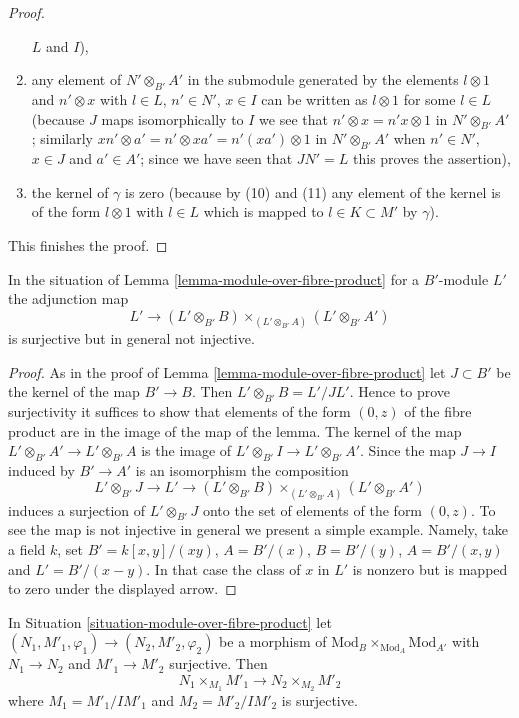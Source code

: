 \begin{proof}
\begin{enumerate}
$L$ and $I$),
\item any element of $N' \otimes_{B'} A'$ in the submodule generated
by the elements $l \otimes 1$ and $n' \otimes x$ with
$l \in L$, $n' \in N'$, $x \in I$ can be written as $l \otimes 1$
for some $l \in L$ (because $J$ maps isomorphically to $I$ we see
that $n' \otimes x = n'x \otimes 1$ in $N' \otimes_{B'} A'$;
similarly $x n' \otimes a' = n' \otimes xa' = n'(xa') \otimes 1$
in $N' \otimes_{B'} A'$ when $n' \in N'$, $x \in J$ and $a' \in A'$;
since we have seen that $JN' = L$ this proves the assertion),
\item the kernel of $\gamma$ is zero (because by (10) and (11) any element of
the kernel is of the form $l \otimes 1$ with $l \in L$ which
is mapped to $l \in K \subset M'$ by $\gamma$).
\end{enumerate}
This finishes the proof.
\end{proof}

\begin{lemma}
\label{lemma-module-over-fibre-product-bis}
In the situation of Lemma \ref{lemma-module-over-fibre-product}
for a $B'$-module $L'$ the adjunction map
$$
L' \longrightarrow 
(L' \otimes_{B'} B) \times_{(L' \otimes_{B'} A)} (L' \otimes_{B'} A')
$$
is surjective but in general not injective.
\end{lemma}

\begin{proof}
As in the proof of Lemma \ref{lemma-module-over-fibre-product}
let $J \subset B'$ be the kernel of the map $B' \to B$.
Then $L' \otimes_{B'} B = L'/JL'$. Hence to prove surjectivity it suffices
to show that elements of the form $(0, z)$ of the fibre product are in the
image of the map of the lemma. The kernel of the map
$L' \otimes_{B'} A' \to L' \otimes_{B'} A$ is the image of
$L' \otimes_{B'} I \to L' \otimes_{B'} A'$. Since the map $J \to I$
induced by $B' \to A'$ is an isomorphism
the composition
$$
L' \otimes_{B'} J \to L' \to
(L' \otimes_{B'} B) \times_{(L' \otimes_{B'} A)} (L' \otimes_{B'} A')
$$
induces a surjection of $L' \otimes_{B'} J$ onto the set of elements
of the form $(0, z)$. To see the map is not injective in general we
present a simple example. Namely, take a field $k$,
set $B' = k[x, y]/(xy)$, $A = B'/(x)$, $B = B'/(y)$, $A = B'/(x, y)$
and $L' = B'/(x - y)$. In that case the class of $x$ in $L'$ is nonzero
but is mapped to zero under the displayed arrow.
\end{proof}

\begin{lemma}
\label{lemma-surjection-module-over-fibre-product}
In Situation \ref{situation-module-over-fibre-product}
let $(N_1, M'_1, \varphi_1) \to (N_2, M'_2, \varphi_2)$ be a morphism
of $\text{Mod}_B \times_{\text{Mod}_A} \text{Mod}_{A'}$
with $N_1 \to N_2$ and $M'_1 \to M'_2$ surjective. Then
$$
N_1 \times_{M_1} M'_1 \to N_2 \times_{M_2} M'_2
$$
where $M_1 = M'_1/IM'_1$ and $M_2 = M'_2/IM'_2$ is surjective.
\end{lemma}

